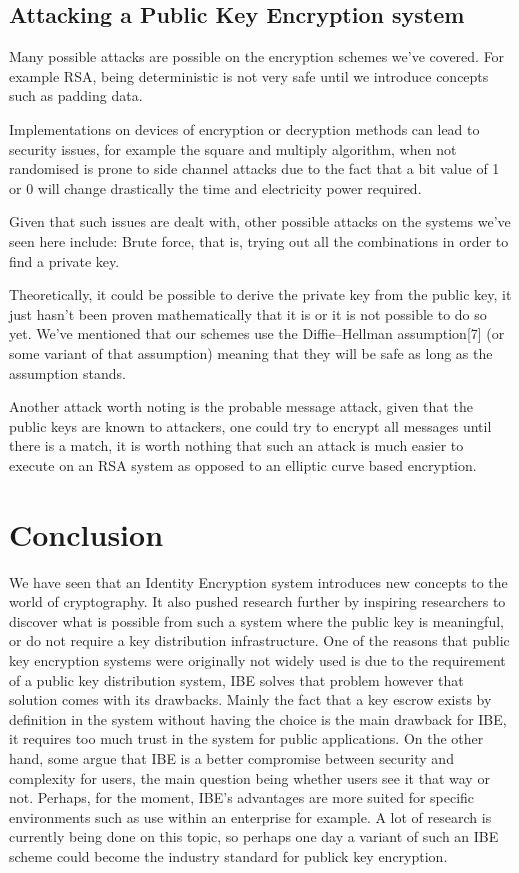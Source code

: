 \documentclass[conference]{IEEEtran}
\begin{document}
\subsection{Attacking a Public Key Encryption system}
Many possible attacks are possible on the encryption schemes we've covered.
For example RSA, being deterministic is not very safe until we introduce concepts such as 
padding data. 

Implementations on devices of encryption or decryption methods 
can lead to security issues, for example the square and multiply algorithm,
when not randomised is prone to side channel attacks due to the fact that a bit value of 1 or 0 
will change drastically the time and electricity power required.

Given that such issues are dealt with, other possible attacks on the systems we've seen here include: 
Brute force, that is, trying out all the combinations in order to find a private key.

Theoretically, it could be possible to derive the private key from the public key, it just 
hasn't been proven mathematically that it is or it is not possible to do so yet.
We've mentioned that our schemes use the Diffie–Hellman assumption[7] (or some variant of that assumption)
meaning that they will be safe as long as the assumption stands.

Another attack worth noting is the probable message attack, given that the public keys are known 
to attackers, one could try to encrypt all messages until there is a match, it is worth nothing that 
such an attack is much easier to execute on an RSA system as opposed to an elliptic curve based encryption.


\section{Conclusion}
We have seen that an Identity Encryption system 
introduces new concepts to the world of cryptography.
It also pushed research further by inspiring researchers
to discover what is possible from such a system where the public key is 
meaningful, or do not require a key distribution infrastructure. 
One of the reasons that public key encryption systems 
were originally not widely used is due to the requirement of a public key 
distribution system, IBE solves that problem however that solution comes with 
its drawbacks. Mainly the fact that a key escrow exists by definition in the system 
without having the choice is the main drawback for IBE, it requires too much 
trust in the system for public applications. On the other hand, some argue that 
IBE is a better compromise between security and complexity for users, the main 
question being whether users see it that way or not.
Perhaps, for the moment, IBE's advantages are more suited for specific 
environments such as use within an enterprise for example.  
A lot of research is currently being done on this topic, so perhaps one day a variant 
of such an IBE scheme could become the industry standard for publick key encryption.
\end{document}
